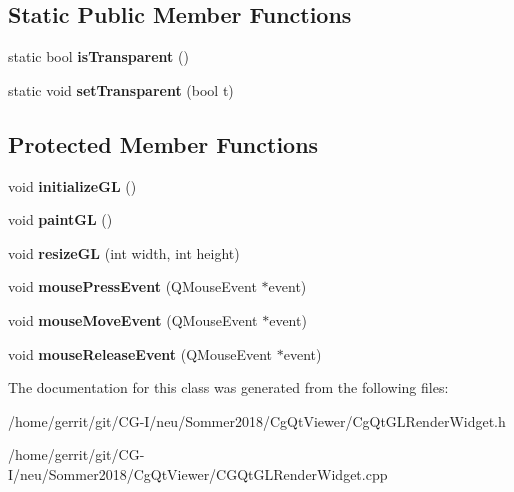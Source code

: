 \subsection*{Static Public Member Functions}
\begin{DoxyCompactItemize}
\item 
\mbox{\label{class_cg_qt_g_l_render_widget_aef33ccad88da63ad6aaa6581205fe5aa}} 
static bool {\bfseries is\+Transparent} ()
\item 
\mbox{\label{class_cg_qt_g_l_render_widget_a9d0227ae7b94fc7f9ba01ab009a20303}} 
static void {\bfseries set\+Transparent} (bool t)
\end{DoxyCompactItemize}
\subsection*{Protected Member Functions}
\begin{DoxyCompactItemize}
\item 
\mbox{\label{class_cg_qt_g_l_render_widget_a12b6f2064c8143ae5e8f76c408f62072}} 
void {\bfseries initialize\+GL} ()
\item 
\mbox{\label{class_cg_qt_g_l_render_widget_ae3a33c3726e4bb01fccc5e42a234f677}} 
void {\bfseries paint\+GL} ()
\item 
\mbox{\label{class_cg_qt_g_l_render_widget_a447d8d72f6694cb3fa6a56fcefa43d46}} 
void {\bfseries resize\+GL} (int width, int height)
\item 
\mbox{\label{class_cg_qt_g_l_render_widget_a22f92a3a2d060684bac08613be96885f}} 
void {\bfseries mouse\+Press\+Event} (Q\+Mouse\+Event $\ast$event)
\item 
\mbox{\label{class_cg_qt_g_l_render_widget_ac9041cae268f9e8469adbd235d865cbf}} 
void {\bfseries mouse\+Move\+Event} (Q\+Mouse\+Event $\ast$event)
\item 
\mbox{\label{class_cg_qt_g_l_render_widget_ae817fede3116093f72520097a1c9bca6}} 
void {\bfseries mouse\+Release\+Event} (Q\+Mouse\+Event $\ast$event)
\end{DoxyCompactItemize}


The documentation for this class was generated from the following files\+:\begin{DoxyCompactItemize}
\item 
/home/gerrit/git/\+C\+G-\/\+I/neu/\+Sommer2018/\+Cg\+Qt\+Viewer/Cg\+Qt\+G\+L\+Render\+Widget.\+h\item 
/home/gerrit/git/\+C\+G-\/\+I/neu/\+Sommer2018/\+Cg\+Qt\+Viewer/C\+G\+Qt\+G\+L\+Render\+Widget.\+cpp\end{DoxyCompactItemize}
